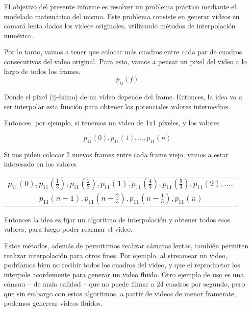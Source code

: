 El objetivo del presente informe es resolver un problema práctico mediante el modelado matemático del mismo. Este problema consiste en generar videos en camará lenta dados los videos originales, utilizando métodos de interpolación numérica.

Por lo tanto, vamos a tener que colocar más cuadros entre cada par de cuadros consecutivos del video original. Para esto, vamos a pensar un pixel del video a lo largo de todos los frames.
\[p_{ij}(f)\]

Donde el pixel (ij-ésimo) de un video depende del frame. Entonces, la idea va a ser interpolar esta función para obtener los potenciales valores intermedios. 

Entonces, por ejemplo, si tenemos un video de 1x1 píxeles, y los valores

\[ p_{11}(0), p_{11}(1), ..., p_{11}(n)\]

Si nos piden colocar 2 nuevos frames entre cada frame viejo, vamos a estar interesado en los valores

\begin{center}
\begin{tabular}{c}
$p_{11}\left(0\right), p_{11}\left(\frac13\right), p_{11}\left(\frac23\right), p_{11}\left(1\right), p_{11}\left(\frac43\right), p_{11}\left(\frac53\right), p_{11}\left(2\right), ...,$ \\
$p_{11}\left(n-1\right), p_{11}\left(n- \frac23\right), p_{11}\left(n- \frac13\right), p_{11}\left(n\right)$ \\
\end{tabular}
\end{center}

Entonces la idea es fijar un algoritmo de interpolación y obtener todos esos valores, para luego poder rearmar el video.

Estos métodos, además de permitirnos realizar cámaras lentas, también permiten realizar interpolación para otros fines.
Por ejemplo, al streamear un video, podríamos bien no recibir todos los cuadros del video, y que el reproductor los interpole acordemente para generar un video fluido. Otro ejemplo de uso es una cámara -- de mala calidad -- que no puede filmar a 24 cuadros por segundo, pero que sin embargo con estos algoritmos, a partir de videos de menor framerate, podemos generear videos fluidos.

